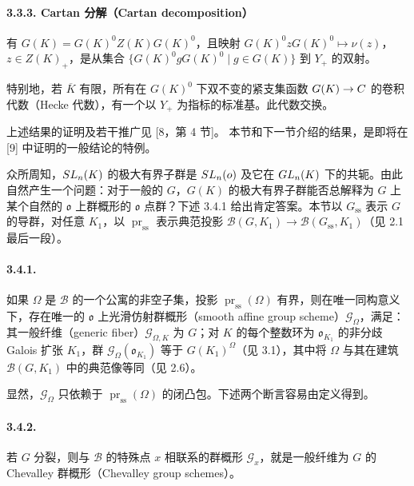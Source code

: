 \paragraph*{3.3.3. Cartan 分解（Cartan decomposition）}有 $G(K)=G(K)^0Z(K)G(K)^0$，且映射 $G(K)^0zG(K)^0\mapsto\nu(z)$，$z\in Z(K)_+$，是从集合 $\{G(K)^0gG(K)^0\mid g\in G(K)\}$ 到 $Y_+$ 的双射。

特别地，若 $\overline K$ 有限，所有在 $G(K)^0$ 下双不变的紧支集函数 $G(K)\to C$ 的卷积代数（Hecke 代数），有一个以 $Y_+$ 为指标的标准基。此代数交换。

上述结果的证明及若干推广见 [8，第 4 节]。
本节和下一节介绍的结果，是即将在 [9] 中证明的一般结论的特例。

众所周知，$SL_n(K)$ 的极大有界子群是 $SL_n(o)$ 及它在 $GL_n(K)$ 下的共轭。由此自然产生一个问题：对于一般的 $G$，$G(K)$ 的极大有界子群能否总解释为 $G$ 上某个自然的 $\mathfrak o$ 上群概形的 $\mathfrak o$ 点群？下述 3.4.1 给出肯定答案。本节以 $G_{\mathrm{ss}}$ 表示 $G$ 的导群，对任意 $K_1$，以 $\operatorname{pr}_{\mathrm{ss}}$ 表示典范投影 $\mathscr B(G,K_1)\to\mathscr B(G_{\mathrm{ss}},K_1)$（见 2.1 最后一段）。

\paragraph*{3.4.1.}如果 $\Omega$ 是 $\mathscr B$ 的一个公寓的非空子集，投影 $\operatorname{pr}_{\mathrm{ss}}(\Omega)$ 有界，则在唯一同构意义下，存在唯一的 $\mathfrak o$ 上光滑仿射群概形（smooth affine group scheme）$\mathscr G_\Omega$，满足：其一般纤维（generic fiber）$\mathscr G_{\Omega,K}$ 为 $G$；对 $K$ 的每个整数环为 $\mathfrak o_{K_1}$ 的非分歧 Galois 扩张 $K_1$，群 $\mathscr G_\Omega(\mathfrak o_{K_1})$ 等于 $G(K_1)^\Omega$（见 3.1），其中将 $\Omega$ 与其在建筑 $\mathscr B(G,K_1)$ 中的典范像等同（见 2.6）。

显然，$\mathscr G_\Omega$ 只依赖于 $\operatorname{pr}_{\mathrm{ss}}(\Omega)$ 的闭凸包。下述两个断言容易由定义得到。

\paragraph*{3.4.2.}若 $G$ 分裂，则与 $\mathscr B$ 的特殊点 $x$ 相联系的群概形 $\mathscr G_x$，就是一般纤维为 $G$ 的 Chevalley 群概形（Chevalley group schemes）。

